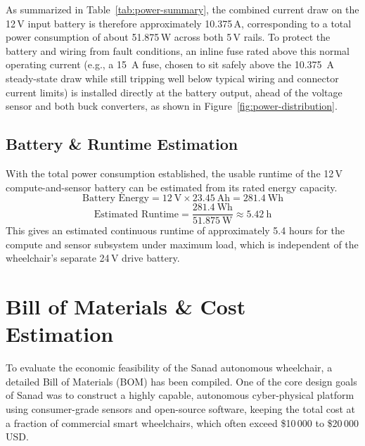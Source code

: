As summarized in Table~\ref{tab:power-summary}, the combined current draw on the 12\,V input battery is therefore approximately 10.375\,A, corresponding to a total power consumption of about 51.875\,W across both 5\,V rails. To protect the battery and wiring from fault conditions, an inline fuse rated above this normal operating current (e.g., a 15~A fuse, chosen to sit safely above the 10.375~A steady-state draw while still tripping well below typical wiring and connector current limits) is installed directly at the battery output, ahead of the voltage sensor and both buck converters, as shown in Figure~\ref{fig:power-distribution}.

\subsection*{Battery \& Runtime Estimation}
With the total power consumption established, the usable runtime of the 12\,V compute-and-sensor battery can be estimated from its rated energy capacity.
\[
\text{Battery Energy} = 12\ \text{V} \times 23.45\ \text{Ah} = 281.4\ \text{Wh}
\]
\[
\text{Estimated Runtime} = \frac{281.4\ \text{Wh}}{51.875\ \text{W}} \approx 5.42\ \text{h}
\]
This gives an estimated continuous runtime of approximately 5.4 hours for the compute and sensor subsystem under maximum load, which is independent of the wheelchair's separate 24\,V drive battery.

\section{Bill of Materials \& Cost Estimation}

To evaluate the economic feasibility of the Sanad autonomous wheelchair, a detailed Bill of Materials (BOM) has been compiled. One of the core design goals of Sanad was to construct a highly capable, autonomous cyber-physical platform using consumer-grade sensors and open-source software, keeping the total cost at a fraction of commercial smart wheelchairs, which often exceed \$10\,000 to \$20\,000 USD.

